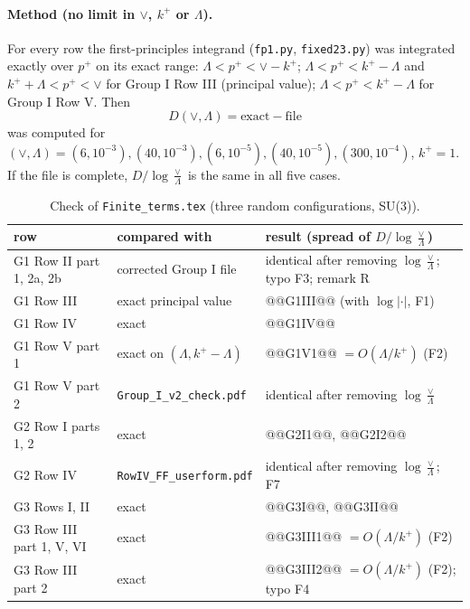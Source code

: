 \documentclass[10pt]{article}
\numberwithin{equation}{section}
\begin{document}
\paragraph{Method (no limit in $\vee$, $k^+$ or $\Lambda$).} For every row the first-principles integrand (\texttt{fp1.py}, \texttt{fixed23.py}) was integrated exactly over $p^+$ on its exact range: $\Lambda<p^+<\vee-k^+$; $\Lambda<p^+<k^+-\Lambda$ and $k^++\Lambda<p^+<\vee$ for Group I Row III (principal value); $\Lambda<p^+<k^+-\Lambda$ for Group I Row V. Then
\begin{equation*}
D(\vee,\Lambda)=\text{exact}-\text{file}
\end{equation*}
was computed for $(\vee,\Lambda)=(6,10^{-3}),(40,10^{-3}),(6,10^{-5}),(40,10^{-5}),(300,10^{-4})$, $k^+=1$. If the file is complete, $D/\log\frac{\vee}{\Lambda}$ is the same in all five cases.
\begin{table}[H]\centering\small
\caption{Check of \texttt{Finite\_terms.tex} (three random configurations, SU(3)).}\label{tab:check}
\begin{tabular}{@{}>{\raggedright\arraybackslash}p{}>{\raggedright\arraybackslash}p{}>{\raggedright\arraybackslash}p{}@{}}\toprule
row & compared with & result (spread of $D/\log\frac\vee\Lambda$)\\\midrule
G1 Row II part 1, 2a, 2b & corrected Group I file & identical after removing $\log\frac\vee\Lambda$; typo F3; remark R\\
G1 Row III & exact principal value & @@G1III@@ (with $\log|\cdot|$, F1)\\
G1 Row IV & exact & @@G1IV@@\\
G1 Row V part 1 & exact on $(\Lambda,k^+-\Lambda)$ & @@G1V1@@ $=O(\Lambda/k^+)$ (F2)\\
G1 Row V part 2 & \texttt{Group\_I\_v2\_check.pdf} & identical after removing $\log\frac\vee\Lambda$\\
G2 Row I parts 1, 2 & exact & @@G2I1@@, @@G2I2@@\\
G2 Row IV & \texttt{RowIV\_FF\_userform.pdf} & identical after removing $\log\frac\vee\Lambda$; F7\\
G3 Rows I, II & exact & @@G3I@@, @@G3II@@\\
G3 Row III part 1, V, VI & exact & @@G3III1@@ $=O(\Lambda/k^+)$ (F2)\\
G3 Row III part 2 & exact & @@G3III2@@ $=O(\Lambda/k^+)$ (F2); typo F4\\\bottomrule
\end{tabular}
\end{table}
\end{document}
